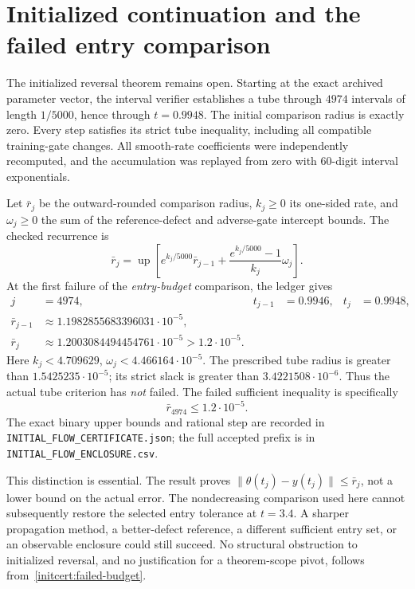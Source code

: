 \section{Initialized continuation and the failed entry comparison}
The initialized reversal theorem remains open. Starting at the exact
archived parameter vector, the interval verifier establishes a tube through
$4974$ intervals of length $1/5000$, hence through $t=0.9948$.
The initial comparison radius is exactly zero. Every step satisfies its
strict tube inequality, including all compatible training-gate changes.
All smooth-rate coefficients were independently recomputed, and the
accumulation was replayed from zero with $60$-digit interval exponentials.

Let $\bar r_j$ be the outward-rounded comparison radius, $k_j\ge0$ its
one-sided rate, and $\omega_j\ge0$ the sum of the reference-defect and
adverse-gate intercept bounds. The checked recurrence is
\[
 \bar r_j=\operatorname{up}\left[
 e^{k_j/5000}\bar r_{j-1}
 +\frac{e^{k_j/5000}-1}{k_j}\omega_j\right].
\]
At the first failure of the \emph{entry-budget} comparison, the ledger gives
\begin{align*}
 j&=4974, &t_{j-1}&=0.9946,&t_j&=0.9948,\\
 \bar r_{j-1}&\approx1.1982855683396031\cdot10^{-5},&&&\\
 \bar r_j&\approx1.2003084494454761\cdot10^{-5}
                  >1.2\cdot10^{-5}.&&&
\end{align*}
Here $k_j<4.709629$, $\omega_j<4.466164\cdot10^{-5}$.
The prescribed tube radius is greater than $1.5425235\cdot10^{-5}$;
its strict slack is greater than $3.4221508\cdot10^{-6}$.
Thus the actual tube criterion has \emph{not} failed. The failed sufficient
inequality is specifically
\begin{equation}\label{initcert:failed-budget}
 \boxed{\bar r_{4974}\le1.2\cdot10^{-5}.}
\end{equation}
The exact binary upper bounds and rational step are recorded in
\texttt{INITIAL\_FLOW\_CERTIFICATE.json}; the full accepted prefix is in
\texttt{INITIAL\_FLOW\_ENCLOSURE.csv}.

This distinction is essential. The result proves
$\|\theta(t_j)-y(t_j)\|\le\bar r_j$, not a lower bound on the actual
error. The nondecreasing comparison used here cannot subsequently restore
the selected entry tolerance at $t=3.4$. A sharper propagation method,
a better-defect reference, a different sufficient entry set, or an
observable enclosure could still succeed. No structural obstruction to
initialized reversal, and no justification for a theorem-scope pivot,
follows from~\eqref{initcert:failed-budget}.

